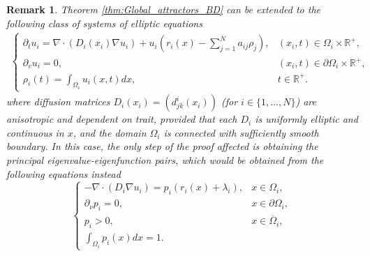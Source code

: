 \documentclass{article}
\newtheorem{rmk}{Remark}[section]
\begin{document}
\begin{rmk}
Theorem \ref{thm:Global_attractors_BD} can be extended to the following class of systems of elliptic equations 
\begin{align*}
    \begin{cases}
        \partial_tu_i=\nabla\cdot(D_i(x_i)\nabla{}u_i)+u_i\left(r_i(x)-\sum_{j=1}^Na_{ij}\rho_j\right),&(x_i,t)\in{\Omega_i}\times\mathbb{R}^+,\\
        \partial_{v}u_i=0,&(x_i,t)\in\partial\Omega_i\times\mathbb{R}^+,\\
        \rho_i(t)=\int_{\Omega_i}u_i(x,t)dx,&t\in\mathbb{R}^+.
    \end{cases}
\end{align*}
where diffusion matrices $D_i(x_i)=(d_{jk}^i(x_i))$ (for $i\in\{1,...,N\}$) are  anisotropic and dependent on trait, provided that each $D_i$ is uniformly elliptic and continuous in $x$, and the domain $\Omega_i$ is connected with sufficiently smooth boundary. In this case, the only step of the proof affected is obtaining the principal eigenvalue-eigenfunction pairs, which would be obtained from the following equations instead 
\begin{equation*}\label{eqn:eigenfunctionsDomainAnistropic}
      \begin{cases}
        -\nabla\cdot(D_i\nabla{}u_i)=p_i\left(r_i(x)+\lambda_i\right),&x\in{\Omega_i},
    \\
    \partial_\nu{}p_i=0,&x\in\partial{\Omega}_i,\\
   p_i>0,&x\in\overline{\Omega}_{i},\\
   \int_{\Omega_i}p_i(x)dx=1.
      \end{cases}
  \end{equation*}

\end{rmk}
\end{document}
